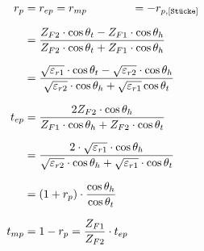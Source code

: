 \begin{equation*}
			\setlength{\jot}{10pt}
\begin{aligned}
	r_p    & =  r_{ep} = r_{mp} \qquad \qquad =-r_{p,[\texttt{Stücke}]}                                                                                                                                                                                                        \\
	& = \frac{Z_{F2} \cdot \cos \theta_t-Z_{F1} \cdot \cos \theta_h}{Z_{F2} \cdot \cos \theta_t+Z_{F1} \cdot \cos \theta_h}                                                                                               \\
	& = \frac{\sqrt{\varepsilon_{r1}}\cdot\cos\theta_t - \sqrt{\varepsilon_{r2}}\cdot\cos\theta_h}{\sqrt{\varepsilon_{r2}}\cdot\cos\theta_h + \sqrt{\varepsilon_{r1}}\cos\theta_t} \\
	t_{ep} & =  \frac{2 Z_{F2} \cdot \cos \theta_h}{Z_{F1} \cdot \cos \theta_h+Z_{F2} \cdot \cos \theta_t}                                                                                                                          \\
		 & = \frac{2\cdot\sqrt{\varepsilon_{r1}}\cdot\cos\theta_h}{\sqrt{\varepsilon_{r2}}\cdot\cos\theta_h + \sqrt{\varepsilon_{r1}}\cdot\cos\theta_t}\\
	& = (1+r_p) \cdot \dfrac{\cos \theta_h}{\cos \theta_t}\\
	t_{mp} 
	& = 1-r_p                                                                                                                                                                                                                                                                                                                                                                                        = \frac{Z_{F1}}{Z_{F2}}\cdot t_{ep}
\end{aligned}
\end{equation*}



